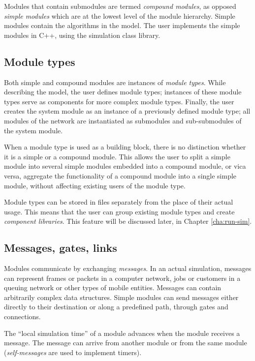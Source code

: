Modules that contain submodules are termed \textit{compound
  modules}, as opposed \textit{simple
  modules} which are at the lowest level of the
module hierarchy. Simple modules contain the algorithms in the model.
The user implements the simple modules in C++, using the {\opp}
simulation class library.


\subsection{Module types}

Both simple and compound modules are instances of \textit{module
  types}. While describing the model, the user defines module types;
instances of these module types serve as components for more complex
module types. Finally, the user creates the system module as an
instance of a previously defined module type; all modules of the
network are instantiated as submodules and sub-submodules of the
system module.

When a module type is used as a building block, there is no
distinction whether it is a simple or a compound module. This allows
the user to split a simple module into several
simple modules embedded into a compound module,
or vica versa, aggregate the functionality of a compound module into a
single simple module, without affecting existing users of the module
type.

Module types can be stored in files separately from the place
of their actual usage. This means that the user can group existing
module types and create \textit{component libraries}. This feature
will be discussed later, in Chapter \ref{cha:run-sim}.



\subsection{Messages, gates, links}

Modules communicate by exchanging
\textit{messages}. In an actual simulation,
messages can represent frames or packets in a computer network, jobs
or customers in a queuing network or other types of mobile entities.
Messages can contain arbitrarily complex data structures. Simple
modules can send messages either directly to their destination or
along a predefined path, through gates and connections.


The ``local simulation time'' of a module advances when the module
receives a message. The message can arrive from another module
or from the same module (\textit{self-messages} are used to implement
timers).


